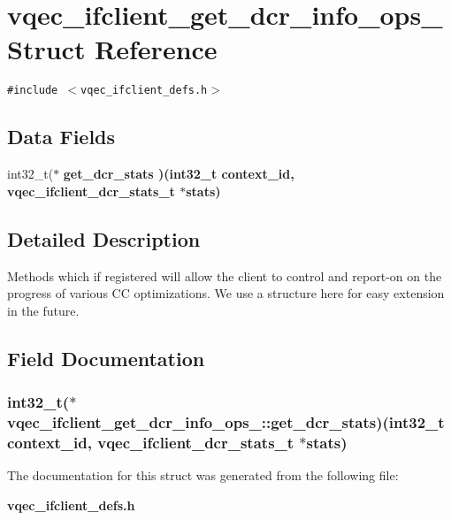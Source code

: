 \section{vqec\_\-ifclient\_\-get\_\-dcr\_\-info\_\-ops\_\- Struct Reference}
\label{structvqec__ifclient__get__dcr__info__ops__}
{\tt \#include $<$vqec\_\-ifclient\_\-defs.h$>$}

\subsection*{Data Fields}
\begin{CompactItemize}
\item 
int32\_\-t($\ast$ \bf{get\_\-dcr\_\-stats} )(int32\_\-t context\_\-id, \bf{vqec\_\-ifclient\_\-dcr\_\-stats\_\-t} $\ast$stats)
\end{CompactItemize}


\subsection{Detailed Description}
Methods which if registered will allow the client to control and report-on on the progress of various CC optimizations. We use a structure here for easy extension in the future. 



\subsection{Field Documentation}
\subsubsection{\setlength{\rightskip}{0pt plus 5cm}int32\_\-t($\ast$ \bf{vqec\_\-ifclient\_\-get\_\-dcr\_\-info\_\-ops\_\-::get\_\-dcr\_\-stats})(int32\_\-t context\_\-id, \bf{vqec\_\-ifclient\_\-dcr\_\-stats\_\-t} $\ast$stats)}\label{structvqec__ifclient__get__dcr__info__ops___483c55d6c1048f5647e55110f32570e9}




The documentation for this struct was generated from the following file:\begin{CompactItemize}
\item 
\bf{vqec\_\-ifclient\_\-defs.h}\end{CompactItemize}
